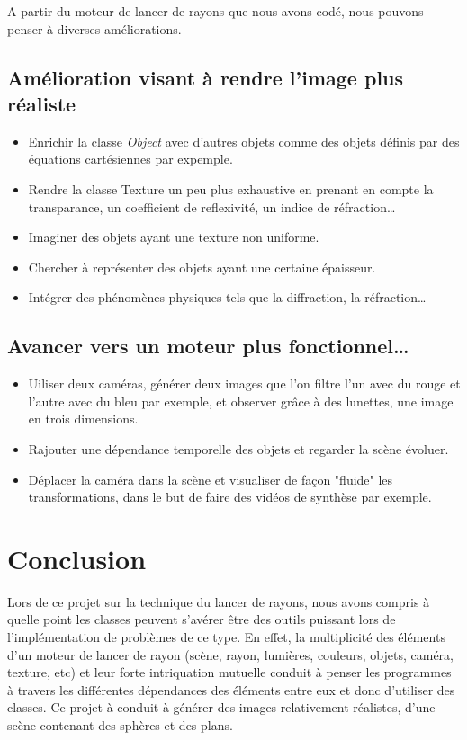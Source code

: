 \documentclass{article}
\begin{document}
A partir du moteur de lancer de rayons que nous avons codé, nous pouvons penser à diverses améliorations.
\subsection{Amélioration visant à rendre l'image plus réaliste}
	\begin{itemize}
		\item Enrichir la classe \emph{Object} avec d'autres objets comme des objets définis par des équations cartésiennes par expemple.
		\item Rendre la classe Texture un peu plus exhaustive en prenant en compte la transparance, un coefficient de reflexivité, un indice de réfraction\dots
		\item Imaginer des objets ayant une texture non uniforme.
		\item Chercher à représenter des objets ayant une certaine épaisseur.
		\item Intégrer des phénomènes physiques tels que la diffraction, la réfraction\dots
	\end{itemize}

\subsection{Avancer vers un moteur plus fonctionnel\dots}
	\begin{itemize}
		\item Uiliser deux caméras, générer deux images que l'on filtre l'un avec du rouge et l'autre avec du bleu par exemple, et observer grâce à des lunettes, une image en trois dimensions.
		\item Rajouter une dépendance temporelle des objets et regarder la scène évoluer.
		\item Déplacer la caméra dans la scène et visualiser de façon "fluide" les transformations, dans le but de faire des vidéos de synthèse par exemple.
	\end{itemize}

\section{Conclusion}
Lors de ce projet sur la technique du lancer de rayons, nous avons compris à quelle point les classes peuvent s'avérer être des outils puissant lors de l'implémentation de problèmes de ce type. En effet, la multiplicité des éléments d'un moteur de lancer de rayon (scène, rayon, lumières, couleurs, objets, caméra, texture, etc) et leur forte intriquation mutuelle conduit à penser les programmes à travers les différentes dépendances des éléments entre eux et donc d'utiliser des classes. Ce projet à conduit à générer des images relativement réalistes, d'une scène contenant des sphères et des plans.
	
\end{document}
